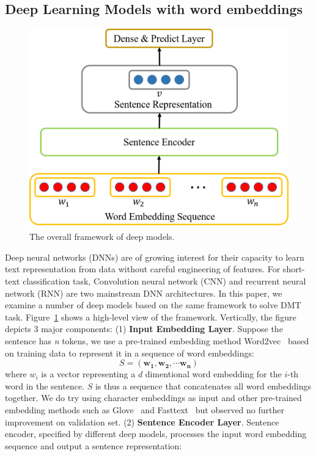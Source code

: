 \documentclass[11pt,a4paper]{article}
\begin{document}
\subsection{Deep Learning Models with word embeddings\label{dl models}}
\begin{figure}
\centering
\includegraphics[scale=0.35]{framework.png}
\caption{The overall framework of deep models.}
\label{framework}
\end{figure}
Deep neural networks (DNNs) are of growing interest for their capacity to learn text representation from data without careful engineering of features.  For short-text classification task, Convolution neural network (CNN) and recurrent neural network (RNN) are two mainstream DNN architectures. In this paper, we examine a number of deep models based on the same framework to solve DMT task. Figure~\ref{framework} shows a high-level view of the framework. Vertically, the figure depicts 3 major components: (1) \textbf{Input Embedding Layer}. Suppose the sentence has \textit{n} tokens, we use a pre-trained embedding method Word2vec~\cite{DBLP:journals/corr/abs-1301-3781} based on training data to represent it in a sequence of word embeddings:
\begin{equation} 
S=\left(\mathbf{w}_{\mathbf{1}}, \mathbf{w}_{\mathbf{2}}, \cdots \mathbf{w}_{\mathbf{n}}\right)
\end{equation}
where $w_i$ is a vector representing a $d$ dimentional word embedding for the $i$-th word in the sentence. $S$ is thus a sequence that concatenates all word embeddings together. We do try using character embeddings as input and other pre-trained embedding methods such as Glove~\cite{pennington2014glove} and Fasttext~\cite{bojanowski2017enriching} but observed no further improvement on validation set. (2) \textbf{Sentence Encoder Layer}. Sentence encoder, specified by different deep models, processes the input word embedding sequence and output a sentence representation: 
\end{document}
